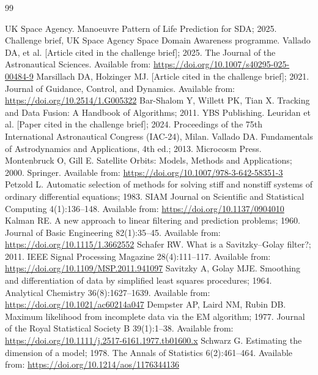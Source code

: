 \documentclass[11pt,a4paper]{article}
\begin{document}
\begin{thebibliography}{99}
 UK Space Agency. Manoeuvre Pattern of Life Prediction for SDA; 2025. Challenge brief, UK Space Agency
  Space Domain Awareness programme.
 Vallado DA, et al. [Article cited in the challenge brief]; 2025. The Journal of the
  Astronautical Sciences. Available from: \url{https://doi.org/10.1007/s40295-025-00484-9}
 Marsillach DA, Holzinger MJ. [Article cited in the challenge brief]; 2021. Journal of
  Guidance, Control, and Dynamics. Available from: \url{https://doi.org/10.2514/1.G005322}
 Bar-Shalom Y, Willett PK, Tian X. Tracking and Data Fusion: A Handbook of Algorithms; 2011.
  YBS Publishing.
 Leuridan et al. [Paper cited in the challenge brief]; 2024. Proceedings of the 75th
  International Astronautical Congress (IAC-24), Milan.
 Vallado DA. Fundamentals of Astrodynamics and Applications, 4th ed.; 2013. Microcosm Press.
 Montenbruck O, Gill E. Satellite Orbits: Models, Methods and Applications; 2000. Springer.
  Available from: \url{https://doi.org/10.1007/978-3-642-58351-3}
 Petzold L. Automatic selection of methods for solving stiff and nonstiff systems of ordinary
  differential equations; 1983. SIAM Journal on Scientific and Statistical Computing 4(1):136--148.
  Available from: \url{https://doi.org/10.1137/0904010}
 Kalman RE. A new approach to linear filtering and prediction problems; 1960. Journal of Basic
  Engineering 82(1):35--45. Available from: \url{https://doi.org/10.1115/1.3662552}
 Schafer RW. What is a Savitzky--Golay filter?; 2011. IEEE Signal Processing Magazine 28(4):111--117.
  Available from: \url{https://doi.org/10.1109/MSP.2011.941097}
 Savitzky A, Golay MJE. Smoothing and differentiation of data by simplified least squares procedures;
  1964. Analytical Chemistry 36(8):1627--1639. Available from: \url{https://doi.org/10.1021/ac60214a047}
 Dempster AP, Laird NM, Rubin DB. Maximum likelihood from incomplete data via the EM algorithm; 1977.
  Journal of the Royal Statistical Society B 39(1):1--38. Available from: \url{https://doi.org/10.1111/j.2517-6161.1977.tb01600.x}
 Schwarz G. Estimating the dimension of a model; 1978. The Annals of Statistics 6(2):461--464.
  Available from: \url{https://doi.org/10.1214/aos/1176344136}

\end{thebibliography}
\end{document}
